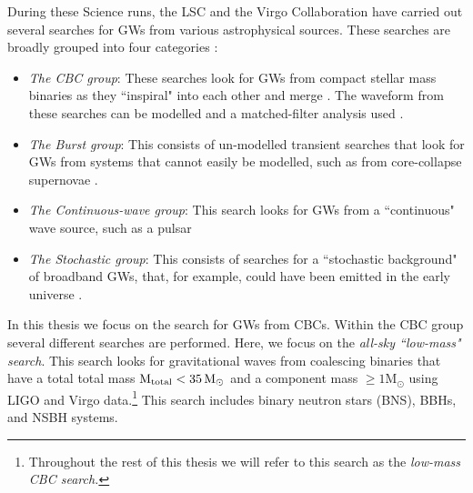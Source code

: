 During these Science runs, the \ac{LSC} and the Virgo Collaboration have
carried out several searches for \acp{GW} from various astrophysical sources.
These searches are broadly grouped into four categories \cite{Abbott:2007kv}:
\begin{itemize}

\item{{\it The \ac{CBC} group}: These searches look for \acp{GW} from compact
stellar mass binaries as they ``inspiral" into each other and merge
\cite{Belczynski:2002}. The waveform from these searches can be modelled and a
matched-filter analysis used \cite{Allen:2005fk}.}

\item{{\it The Burst group}: This consists of un-modelled transient searches
that look for \acp{GW} from systems that cannot easily be modelled, such as from
core-collapse supernovae \cite{Anderson:2000yy}.}

\item{{\it The Continuous-wave group}: This search looks for \acp{GW} from a
``continuous" wave source, such as a pulsar \cite{Collaboration:S5Pulsar}}

\item{{\it The Stochastic group}: This consists of searches for a ``stochastic
background" of broadband \acp{GW}, that, for example, could have been emitted
in the early universe \cite{Collaboration:S5stochastic}.}

\end{itemize} In this thesis we focus on the search for \acp{GW} from
\acp{CBC}. Within the \ac{CBC} group several different searches are performed.
Here, we focus on the \emph{all-sky ``low-mass" search}. This search looks for
gravitational waves from coalescing binaries that have a total total mass
$\mathrm{M_{total}} < 35\,\mathrm{M_\odot}$ and a component mass $\mathrm{\geq 1M_\odot}$ using LIGO
and Virgo data.\footnote{Throughout the rest of this thesis we will refer to
this search as the \emph{low-mass \ac{CBC} search.}} This search includes
binary neutron stars (BNS), \acp{BBH}, and \ac{NSBH} systems.

